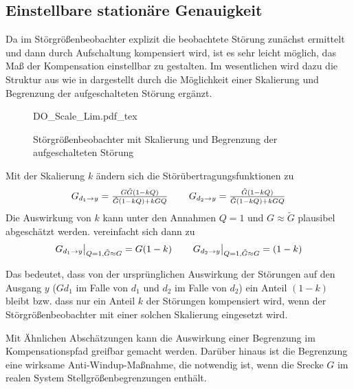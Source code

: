 
\subsection{Einstellbare stationäre Genauigkeit}\label{subS:DO_Scale_Lim}
Da im Störgrößenbeobachter explizit die beobachtete Störung zunächst ermittelt und dann durch Aufschaltung kompensiert wird, ist es sehr leicht möglich, das Maß der Kompensation einstellbar zu gestalten. Im wesentlichen wird dazu die Struktur aus  wie in  dargestellt durch die Möglichkeit einer Skalierung und Begrenzung der aufgeschalteten Störung ergänzt. 

\begin{figure}[htp!]
\centering
{DO_Scale_Lim.pdf_tex}
\caption{Störgrößenbeobachter mit Skalierung und Begrenzung der aufgeschalteten Störung}
\label{fig:DO_Scale_Lim}
\end{figure}

Mit der Skalierung $k$ ändern sich die Störübertragungsfunktionen  zu
\begin{equation}
\setlength\arraycolsep{11pt}
\begin{matrix}
G_{d_1\rightarrow y} = \frac{G\tilde G(1-kQ)}{\tilde G(1-kQ)+kGQ} & 
G_{d_2\rightarrow y} = \frac{\tilde G(1-kQ)}{\tilde G(1-kQ)+kGQ}
\end{matrix}\label{eq:DO5}
\end{equation}
Die Auswirkung von $k$ kann unter den Annahmen $Q=1$ und $G\approx\tilde G$ plausibel abgeschätzt werden.  vereinfacht sich dann zu
\begin{equation}
\setlength\arraycolsep{11pt}
\begin{matrix}
G_{d_1\rightarrow y}\big\rvert_{Q=1, \tilde G \approx G} = G(1-k) & 
G_{d_2\rightarrow y}\big\rvert_{Q=1, \tilde G \approx G} = (1-k)
\end{matrix}\label{eq:DO7}
\end{equation}

Das bedeutet, dass von der ursprünglichen Auswirkung der Störungen auf den Ausgang $y$ ($Gd_1$ im Falle von $d_1$ und $d_2$ im Falle von $d_2$) ein Anteil $(1-k)$ bleibt bzw. dass nur ein Anteil $k$ der Störungen kompensiert wird, wenn der Störgrößenbeobachter mit einer solchen Skalierung eingesetzt wird.

Mit Ähnlichen Abschätzungen kann die Auswirkung einer Begrenzung im Kompensationspfad greifbar gemacht werden. Darüber hinaus ist die Begrenzung eine wirksame Anti-Windup-Maßnahme, die notwendig ist, wenn die Srecke $G$ im realen System Stellgrößenbegrenzungen enthält.

